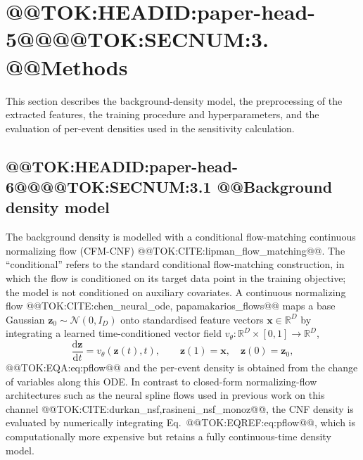 \documentclass[11pt]{article}
\begin{document}
\section{@@TOK:HEADID:paper-head-5@@@@TOK:SECNUM:3. @@Methods}

This section describes the background-density model, the preprocessing of
the extracted features, the training procedure and hyperparameters, and the
evaluation of per-event densities used in the sensitivity calculation.

\subsection{@@TOK:HEADID:paper-head-6@@@@TOK:SECNUM:3.1 @@Background density model}

The background density is modelled with a conditional flow-matching
continuous normalizing flow (CFM-CNF) @@TOK:CITE:lipman_flow_matching@@. The
``conditional'' refers to the standard conditional flow-matching
construction, in which the flow is conditioned on its target data point in
the training objective; the model is not conditioned on auxiliary
covariates. A continuous normalizing flow @@TOK:CITE:chen_neural_ode,
papamakarios_flows@@ maps a base Gaussian $\mathbf{z}_0 \sim
\mathcal{N}(0, I_D)$ onto standardised feature vectors $\mathbf{x}\in
\mathbb{R}^D$ by integrating a learned time-conditioned vector field
$v_\theta: \mathbb{R}^D\times[0,1]\to\mathbb{R}^D$,
\begin{equation}
  \frac{\mathrm{d}\mathbf{z}}{\mathrm{d}t}
  = v_\theta\!\left(\mathbf{z}(t), t\right), \qquad
  \mathbf{z}(1)=\mathbf{x}, \quad \mathbf{z}(0)=\mathbf{z}_0,
  
\end{equation}@@TOK:EQA:eq:pflow@@
and the per-event density is obtained from the change of variables along
this ODE. In contrast to closed-form normalizing-flow architectures such as
the neural spline flows used in previous work on this channel
@@TOK:CITE:durkan_nsf,rasineni_nsf_monoz@@, the CNF density is evaluated by
numerically integrating Eq.~@@TOK:EQREF:eq:pflow@@, which is computationally more
expensive but retains a fully continuous-time density model.
\end{document}
